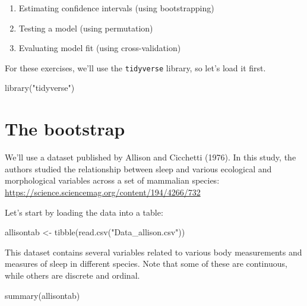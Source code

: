 \documentclass[
]{book}
\newenvironment{Shaded}{\begin{snugshade}}{\end{snugshade}}
\newcommand{\FunctionTok}[1]{\textcolor[rgb]{0.00,0.00,0.00}{#1}}
\newcommand{\NormalTok}[1]{#1}
\newcommand{\OtherTok}[1]{\textcolor[rgb]{0.56,0.35,0.01}{#1}}
\newcommand{\StringTok}[1]{\textcolor[rgb]{0.31,0.60,0.02}{#1}}
\begin{document}
\begin{enumerate}
\def\labelenumi{\arabic{enumi}.}
\item
  Estimating confidence intervals (using bootstrapping)
\item
  Testing a model (using permutation)
\item
  Evaluating model fit (using cross-validation)
\end{enumerate}

For these exercises, we'll use the \texttt{tidyverse} library, so let's load it first.

\begin{Shaded}
\begin{Highlighting}[]
\FunctionTok{library}\NormalTok{(}\StringTok{"tidyverse"}\NormalTok{)}
\end{Highlighting}
\end{Shaded}

\hypertarget{the-bootstrap}{%
\section{The bootstrap}\label{the-bootstrap}}

We'll use a dataset published by Allison and Cicchetti (1976). In this study, the authors studied the relationship between sleep and various ecological and morphological variables across a set of mammalian species: \url{https://science.sciencemag.org/content/194/4266/732}

Let's start by loading the data into a table:

\begin{Shaded}
\begin{Highlighting}[]
\NormalTok{allisontab }\OtherTok{\textless{}{-}} \FunctionTok{tibble}\NormalTok{(}\FunctionTok{read.csv}\NormalTok{(}\StringTok{"Data\_allison.csv"}\NormalTok{))}
\end{Highlighting}
\end{Shaded}

This dataset contains several variables related to various body measurements and measures of sleep in different species. Note that some of these are continuous, while others are discrete and ordinal.

\begin{Shaded}
\begin{Highlighting}[]
\FunctionTok{summary}\NormalTok{(allisontab)}
\end{Highlighting}
\end{Shaded}
\end{document}
